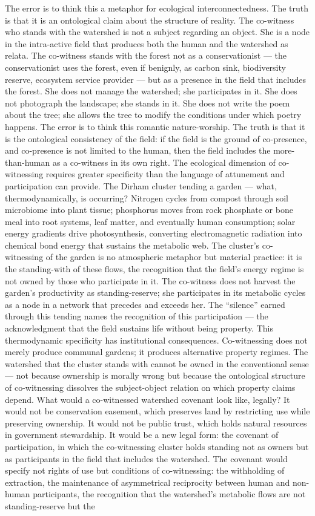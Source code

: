 The error is to think this a metaphor for ecological interconnectedness. The truth is that it is an ontological claim about the structure of reality. The co-witness who stands with the watershed is not a subject regarding an object. She is a node in the intra-active field that produces both the human and the watershed as relata. The co-witness stands with the forest not as a conservationist — the conservationist uses the forest, even if benignly, as carbon sink, biodiversity reserve, ecosystem service provider — but as a presence in the field that includes the forest. She does not manage the watershed; she participates in it. She does not photograph the landscape; she stands in it. She does not write the poem about the tree; she allows the tree to modify the conditions under which poetry happens. The error is to think this romantic nature-worship. The truth is that it is the ontological consistency of the field: if the field is the ground of co-presence, and co-presence is not limited to the human, then the field includes the more-than-human as a co-witness in its own right. The ecological dimension of co-witnessing requires greater specificity than the language of attunement and participation can provide. The Dirham cluster tending a garden — what, thermodynamically, is occurring? Nitrogen cycles from compost through soil microbiome into plant tissue; phosphorus moves from rock phosphate or bone meal into root systems, leaf matter, and eventually human consumption; solar energy gradients drive photosynthesis, converting electromagnetic radiation into chemical bond energy that sustains the metabolic web. The cluster’s co-witnessing of the garden is no atmospheric metaphor but material practice: it is the standing-with of these flows, the recognition that the field’s energy regime is not owned by those who participate in it. The co-witness does not harvest the garden’s productivity as standing-reserve; she participates in its metabolic cycles as a node in a network that precedes and exceeds her. The “silence” earned through this tending names the recognition of this participation — the acknowledgment that the field sustains life without being property. This thermodynamic specificity has institutional consequences. Co-witnessing does not merely produce communal gardens; it produces alternative property regimes. The watershed that the cluster stands with cannot be owned in the conventional sense — not because ownership is morally wrong but because the ontological structure of co-witnessing dissolves the subject-object relation on which property claims depend. What would a co-witnessed watershed covenant look like, legally? It would not be conservation easement, which preserves land by restricting use while preserving ownership. It would not be public trust, which holds natural resources in government stewardship. It would be a new legal form: the covenant of participation, in which the co-witnessing cluster holds standing not as owners but as participants in the field that includes the watershed. The covenant would specify not rights of use but conditions of co-witnessing: the withholding of extraction, the maintenance of asymmetrical reciprocity between human and non-human participants, the recognition that the watershed’s metabolic flows are not standing-reserve but the 